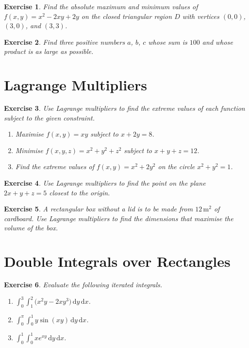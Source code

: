 \documentclass[12pt,a4paper]{article}
\theoremstyle{exercise}
\newtheorem{exercise}{Exercise}[section]
\theoremstyle{hint}
\newcommand{\dd}{\,\mathrm{d}}
\begin{document}
\begin{exercise}
Find the absolute maximum and minimum values of $f(x,y)=x^{2}-2xy+2y$
on the closed triangular region $D$ with vertices $(0,0)$, $(3,0)$, and
$(3,3)$.
\end{exercise}

\begin{exercise}
Find three positive numbers $a$, $b$, $c$ whose sum is $100$ and whose
product is as large as possible.
\end{exercise}

\section{Lagrange Multipliers}

\begin{exercise}
Use Lagrange multipliers to find the extreme values of each function
subject to the given constraint.
\begin{enumerate}[label=(\alph*)]
  \item Maximise $f(x,y)=xy$ subject to $x+2y=8$.
  \item Minimise $f(x,y,z)=x^{2}+y^{2}+z^{2}$ subject to $x+y+z=12$.
  \item Find the extreme values of $f(x,y)=x^{2}+2y^{2}$ on the circle
        $x^{2}+y^{2}=1$.
\end{enumerate}
\end{exercise}

\begin{exercise}
Use Lagrange multipliers to find the point on the plane $2x+y+z=5$
closest to the origin.
\end{exercise}

\begin{exercise}
A rectangular box without a lid is to be made from $12\,\text{m}^{2}$
of cardboard.  Use Lagrange multipliers to find the dimensions that
maximise the volume of the box.
\end{exercise}

\section{Double Integrals over Rectangles}

\begin{exercise}
Evaluate the following iterated integrals.
\begin{enumerate}[label=(\alph*)]
  \item $\displaystyle\int_{0}^{3}\int_{1}^{2}
          \bigl(x^{2}y-2xy^{3}\bigr)\dd y\dd x$.
  \item $\displaystyle\int_{0}^{\pi}\int_{0}^{1}
          y\sin(xy)\dd y\dd x$.
  \item $\displaystyle\int_{0}^{1}\int_{0}^{1}
          xe^{xy}\dd y\dd x$.
\end{enumerate}
\end{exercise}
\end{document}

